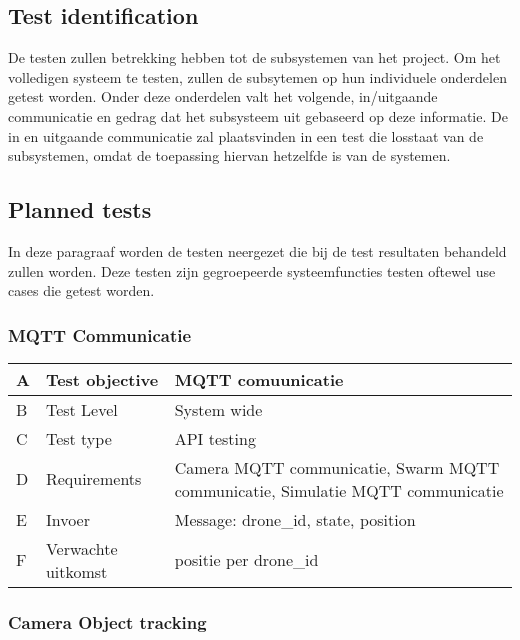\newpage

\subsection{Test identification}
De testen zullen betrekking hebben tot de subsystemen van het project. Om het volledigen systeem te testen, zullen de subsytemen op hun individuele onderdelen getest worden. Onder deze onderdelen valt het volgende, in/uitgaande communicatie en gedrag dat het subsysteem uit gebaseerd op deze informatie.
De in en uitgaande communicatie zal plaatsvinden in een test die losstaat van de subsystemen, omdat de toepassing hiervan hetzelfde is van de systemen.


\subsection{Planned tests}
In deze paragraaf worden de testen neergezet die bij de test resultaten behandeld zullen worden.
Deze testen zijn gegroepeerde systeemfuncties testen oftewel use cases die getest worden. 

\subsubsection{MQTT Communicatie}

\begin{table}[hbt!]
    \begin{tabular}[t]{|m{0.3cm}|m{3.2cm}|m{7.5cm}|}\hline
    A & Test objective & MQTT comuunicatie \\ \hline
    B & Test Level & System wide\\ \hline
    C & Test type & API testing\\ \hline
    D & Requirements & Camera MQTT communicatie, Swarm MQTT communicatie, Simulatie MQTT communicatie\\ \hline
    E & Invoer & Message: drone\_id, state, position\\ \hline
    F & Verwachte uitkomst & positie per drone\_id\\ \hline
    \end{tabular}
\end{table}


\subsubsection{Camera Object tracking}

